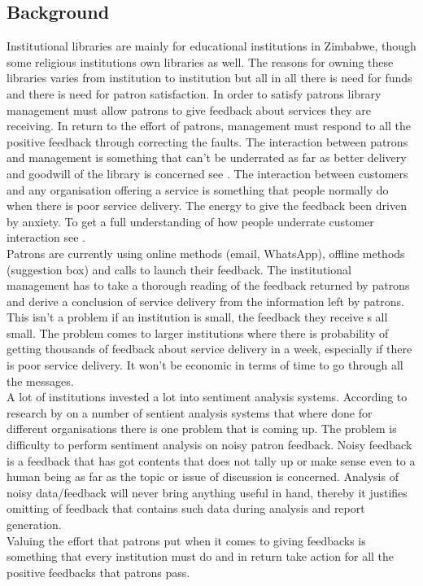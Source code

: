 \documentclass[12pt]{report}
\begin{document}
	\subsection{Background}
	Institutional libraries are mainly for educational institutions in Zimbabwe, though some religious institutions own libraries as well. The reasons for owning these libraries varies from institution to institution but all in all there is need for funds and there is need for patron satisfaction. In order to satisfy patrons library management must allow patrons to give feedback about services they are receiving. In return to the effort of patrons, management must respond to all the positive feedback through correcting the faults. The interaction between patrons and management is something that can’t be underrated as far as better delivery and goodwill of the library is concerned see \citep{esuli2006sentiwordnet}. The interaction between customers and any organisation offering a service is something that people normally do when there is poor service delivery. The energy to give the feedback been driven by anxiety. To get a full understanding of how people underrate customer interaction see \cite{PINE}.\\ 
	Patrons are currently using online methods (email, WhatsApp), offline methods (suggestion box) and calls \citep{pasquale2011system} to launch their feedback. The institutional management has to take a thorough reading of the feedback returned by patrons and derive a conclusion of service delivery from the information left by patrons. This isn’t a problem if an institution is small, the feedback they receive s all small. The problem comes to larger institutions where there is probability of getting thousands of feedback about service delivery in a week, especially if there is poor service delivery. It won’t be economic in terms of time to go through all the messages. \\	
	A lot of institutions invested a lot into sentiment analysis systems. According to research by \cite{gamon2004sentiment} on a number of sentient analysis systems that where done for different organisations there is one problem that is coming up. The problem is difficulty to perform sentiment analysis on noisy patron feedback. Noisy feedback is a feedback that has got contents that does not tally up or make sense even to a human being as far as the topic or issue of discussion is concerned. Analysis of noisy data/feedback will never bring anything useful in hand, thereby it justifies omitting of feedback that contains such data during analysis and report generation.\\
	Valuing the effort that patrons put when it comes to giving feedbacks is something that every institution must do and in return take action for all the positive feedbacks that patrons pass.
	
\end{document}
